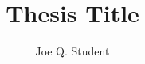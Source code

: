 \documentclass[me,thesis]{kuthesis}
\title{%
  Thesis Title%
}
\author{Joe Q. Student}{Student, Joe Q.}
\begin{document}
\volume

\maketitle
\makedisclaimer
\makepreface









\appendices








\end{document}
